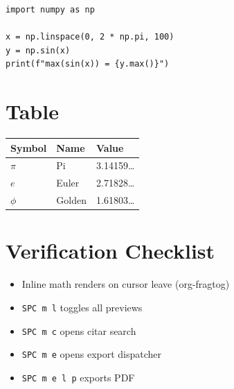 \documentclass[11pt]{article}
\begin{document}
\begin{verbatim}
import numpy as np

x = np.linspace(0, 2 * np.pi, 100)
y = np.sin(x)
print(f"max(sin(x)) = {y.max()}")
\end{verbatim}

\section{Table}
\label{sec:orgd0003a8}

\begin{center}
	\begin{tabular}{lll}
		Symbol   & Name   & Value           \\[0pt]
		\hline
		\(\pi\)  & Pi     & 3.14159\ldots{} \\[0pt]
		\(e\)    & Euler  & 2.71828\ldots{} \\[0pt]
		\(\phi\) & Golden & 1.61803\ldots{} \\[0pt]
	\end{tabular}
\end{center}

\section{Verification Checklist}
\label{sec:org5985c7c}

\begin{itemize}
	\item[{$\square$}] Inline math renders on cursor leave (org-fragtog)
	\item[{$\square$}] \texttt{SPC m l} toggles all previews
	\item[{$\square$}] \texttt{SPC m c} opens citar search
	\item[{$\square$}] \texttt{SPC m e} opens export dispatcher
	\item[{$\square$}] \texttt{SPC m e l p} exports PDF
\end{itemize}
\end{document}
